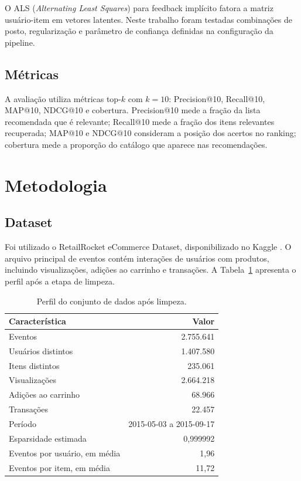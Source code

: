 \documentclass[12pt]{article}
\begin{document}
O ALS (\textit{Alternating Least Squares}) para feedback impl\'icito
\cite{hu2008collaborative} fatora a matriz usu\'ario-item em vetores latentes.
Neste trabalho foram testadas combina\c{c}\~oes de posto, regulariza\c{c}\~ao e
par\^ametro de confian\c{c}a definidas na configura\c{c}\~ao da pipeline.

\subsection{M\'etricas}

A avalia\c{c}\~ao utiliza m\'etricas top-$k$ com $k=10$: Precision@10,
Recall@10, MAP@10, NDCG@10 e cobertura. Precision@10 mede a fra\c{c}\~ao da
lista recomendada que \'e relevante; Recall@10 mede a fra\c{c}\~ao dos itens
relevantes recuperada; MAP@10 e NDCG@10 consideram a posi\c{c}\~ao dos acertos
no ranking; cobertura mede a propor\c{c}\~ao do cat\'alogo que aparece nas
recomenda\c{c}\~oes.

\section{Metodologia}

\subsection{Dataset}

Foi utilizado o RetailRocket eCommerce Dataset, disponibilizado no Kaggle
\cite{retailrocket2015dataset}. O arquivo principal de eventos cont\'em
intera\c{c}\~oes de usu\'arios com produtos, incluindo visualiza\c{c}\~oes,
adi\c{c}\~oes ao carrinho e transa\c{c}\~oes. A Tabela~\ref{tab:dataset}
apresenta o perfil ap\'os a etapa de limpeza.

\begin{table}[!htbp]
\centering
\caption{Perfil do conjunto de dados ap\'os limpeza.}
\label{tab:dataset}
\begin{tabular}{lr}
\toprule
Caracter\'istica & Valor \\
\midrule
Eventos & 2.755.641 \\
Usu\'arios distintos & 1.407.580 \\
Itens distintos & 235.061 \\
Visualiza\c{c}\~oes & 2.664.218 \\
Adi\c{c}\~oes ao carrinho & 68.966 \\
Transa\c{c}\~oes & 22.457 \\
Per\'iodo & 2015-05-03 a 2015-09-17 \\
Esparsidade estimada & 0{,}999992 \\
Eventos por usu\'ario, em m\'edia & 1{,}96 \\
Eventos por item, em m\'edia & 11{,}72 \\
\bottomrule
\end{tabular}
\end{table}
\end{document}
